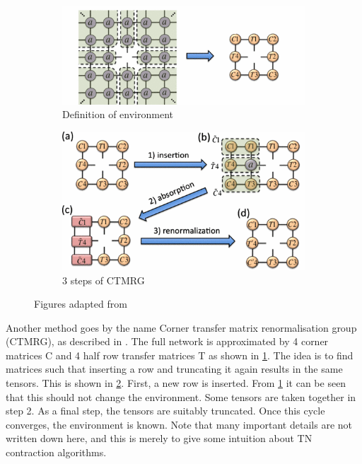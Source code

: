 \begin{figure}[!htbp]
    \centering
    \begin{subfigure}[b]{0.8\textwidth}
        \centering
        \includegraphics[width=\textwidth]{Figuren/tnalgs/CTMRG_Def.png   }
        \caption{Definition of environment}
        \label{fig:tnalgs:ctmrg:a}
    \end{subfigure}

    \begin{subfigure}[b]{0.7\textwidth}
        \centering
        \includegraphics[width=\textwidth]{Figuren/tnalgs/CTMRG.png   }
        \caption{3 steps of CTMRG}
        \label{fig:tnalgs:ctmrg:b}
    \end{subfigure}
    \caption{  Figures adapted from \cite{orus} }
    \label{fig:tnalgs:ctmrg}
\end{figure}

Another method goes by the name Corner transfer matrix renormalisation group (CTMRG), as described in \cite{orus}. The full network is approximated by 4 corner matrices C and 4 half row transfer matrices T as shown in \cref{fig:tnalgs:ctmrg:a}. The idea is to find matrices such that inserting a row and truncating it again results in the same tensors. This is shown in \cref{fig:tnalgs:ctmrg:b}. First, a new row is inserted. From \cref{fig:tnalgs:ctmrg:a} it can be seen that this should not change the environment. Some tensors are taken together in step 2. As a final step, the tensors are suitably truncated. Once this cycle converges, the environment is known. Note that many important details are not written down here, and this is merely to give some intuition about \Gls{TN} contraction algorithms.

